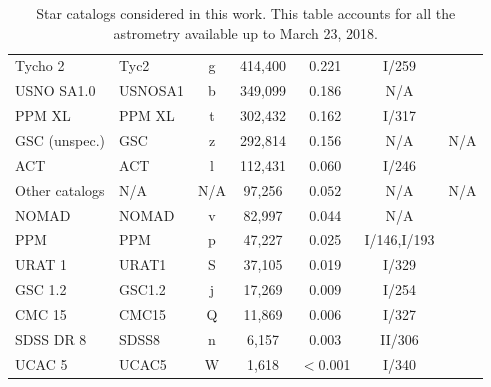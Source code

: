 \documentclass[review]{elsarticle}
\begin{document}
\begin{table}
\begin{center}
\begin{tabular}{llccccc}
Tycho 2     & Tyc2  & g  & 414,400 & 0.221 &  I/259          &\citet{tycho2}\\
USNO SA1.0  & USNOSA1  & b  & 349,099 & 0.186 & N/A        &\citet{usnoa1}\\
PPM XL       & PPM XL  & t  & 302,432 & 0.162 & I/317         &\citet{ppmxl}\\
GSC (unspec.)& GSC & z & 292,814 & 0.156    & N/A          &N/A\\
ACT         & ACT  & l & 112,431 & 0.060 & I/246             &\citet{act}\\
Other catalogs & N/A &N/A& 97,256 & $0.052$ & N/A & N/A\\
NOMAD       & NOMAD  & v  & 82,997 & 0.044 & N/A           &\citet{nomad}\\
PPM         & PPM  & p & 47,227 & 0.025 & I/146,I/193              &\citet{ppm}\\
URAT 1      & URAT1  & S & 37,105 & 0.019 & I/329            &\citet{urat1}\\
GSC 1.2     & GSC1.2& j  & 17,269 & 0.009 & I/254            &\citet{gsc1.2}\\
CMC 15      & CMC15& Q  & 11,869 & 0.006 &  I/327            &\citet{cmc15}\\
SDSS DR 8    & SDSS8  & n &  6,157 & 0.003 & II/306            &\citet{sdss8}\\
UCAC 5   & UCAC5 & W & 1,618 & $<$0.001 & I/340 & \citet{ucac5} \\

\hline
\end{tabular}
\end{center}
\caption{Star catalogs considered in this work. This table accounts for all the astrometry
  available up to March 23, 2018.}
\label{tab:catalogs}
\end{table}
\end{document}
